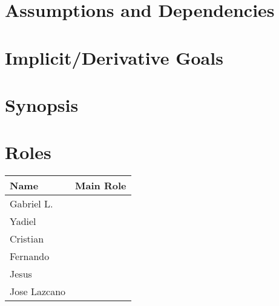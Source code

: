 \documentclass{article}
\begin{document}
\section{Assumptions and Dependencies}

\section{Implicit/Derivative Goals}
\section{Synopsis}
\section{Roles}
\begin{center}

\begin{tabular}{| l | p{5cm} |}\hline
Name & Main Role \\ \hline
Gabriel L. & \\ \hline
Yadiel     & \\ \hline
Cristian   & \\ \hline
Fernando   & \\ \hline
Jesus	   & \\ \hline
Jose Lazcano  & \\ \hline
\end{tabular}

\end{center}
\end{document}
